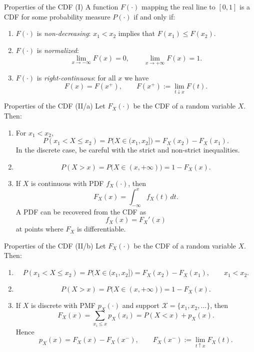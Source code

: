 \documentclass[12pt,a4paper,oneside]{report}
\begin{document}
\begin{framedprop}{Properties of the CDF (I)}\label{prop:cdf-properties-i}
A function $F(\cdot)$ mapping the real line to $[0,1]$ is a CDF
for some probability measure $P(\cdot)$ if and only if:
\begin{enumerate}
  \item $F(\cdot)$ is \emph{non-decreasing}: $x_1<x_2$ implies that
    $F(x_1)\leq F(x_2)$.
  \item $F(\cdot)$ is \emph{normalized}:
    \[
      \lim_{x\to-\infty}F(x)=0,
      \qquad
      \lim_{x\to+\infty}F(x)=1.
    \]
  \item $F(\cdot)$ is \emph{right-continuous}: for all $x$ we have
    \[
      F(x)=F(x^+),
      \qquad F(x^+):=\lim_{t\downarrow x}F(t).
    \]
\end{enumerate}
\end{framedprop}

\begin{framedprop}{Properties of the CDF (II/a)}
Let $F_X(\cdot)$ be the CDF of a random variable $X$. Then:
\begin{enumerate}
  \item For $x_1<x_2$,
    \[
      P(x_1<X\leq x_2)=P\bigl(X\in(x_1,x_2]\bigr)
        =F_X(x_2)-F_X(x_1).
    \]
    In the discrete case, be careful with the strict and non-strict
    inequalities.
  \item
    \[
      P(X>x)=P\bigl(X\in(x,+\infty)\bigr)=1-F_X(x).
    \]
  \item If $X$ is continuous with PDF $f_X(\cdot)$, then
    \[
      F_X(x)=\int_{-\infty}^{x}f_X(t)\,dt.
    \]
    A PDF can be recovered from the CDF as
    \[
      f_X(x)=F_X'(x)
    \]
    at points where $F_X$ is differentiable.
\end{enumerate}
\end{framedprop}

\begin{framedprop}{Properties of the CDF (II/b)}
Let $F_X(\cdot)$ be the CDF of a random variable $X$. Then:
\begin{enumerate}
  \item
    \[
      P(x_1<X\leq x_2)=P\bigl(X\in(x_1,x_2]\bigr)
        =F_X(x_2)-F_X(x_1),\qquad x_1<x_2.
    \]
  \item
    \[
      P(X>x)=P\bigl(X\in(x,+\infty)\bigr)=1-F_X(x).
    \]
  \item If $X$ is discrete with PMF $p_X(\cdot)$ and support
    $\mathcal X=\{x_1,x_2,\ldots\}$, then
    \[
      F_X(x)=\sum_{x_i\leq x}p_X(x_i)=P(X<x)+p_X(x).
    \]
    Hence
    \[
      p_X(x)=F_X(x)-F_X(x^-),
      \qquad F_X(x^-):=\lim_{t\uparrow x}F_X(t).
    \]
\end{enumerate}
\end{framedprop}
\end{document}
